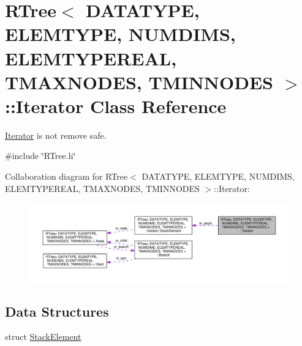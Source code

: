 \hypertarget{classRTree_1_1Iterator}{\section{R\-Tree$<$ D\-A\-T\-A\-T\-Y\-P\-E, E\-L\-E\-M\-T\-Y\-P\-E, N\-U\-M\-D\-I\-M\-S, E\-L\-E\-M\-T\-Y\-P\-E\-R\-E\-A\-L, T\-M\-A\-X\-N\-O\-D\-E\-S, T\-M\-I\-N\-N\-O\-D\-E\-S $>$\-:\-:Iterator Class Reference}
\label{classRTree_1_1Iterator}
}


\hyperlink{classRTree_1_1Iterator}{Iterator} is not remove safe.  




{\ttfamily \#include \char`\"{}R\-Tree.\-h\char`\"{}}



Collaboration diagram for R\-Tree$<$ D\-A\-T\-A\-T\-Y\-P\-E, E\-L\-E\-M\-T\-Y\-P\-E, N\-U\-M\-D\-I\-M\-S, E\-L\-E\-M\-T\-Y\-P\-E\-R\-E\-A\-L, T\-M\-A\-X\-N\-O\-D\-E\-S, T\-M\-I\-N\-N\-O\-D\-E\-S $>$\-:\-:Iterator\-:\nopagebreak
\begin{figure}[H]
\begin{center}
\leavevmode
\includegraphics[width=350pt]{classRTree_1_1Iterator__coll__graph}
\end{center}
\end{figure}
\subsection*{Data Structures}
\begin{DoxyCompactItemize}
\item 
struct \hyperlink{structRTree_1_1Iterator_1_1StackElement}{Stack\-Element}
\end{DoxyCompactItemize}
